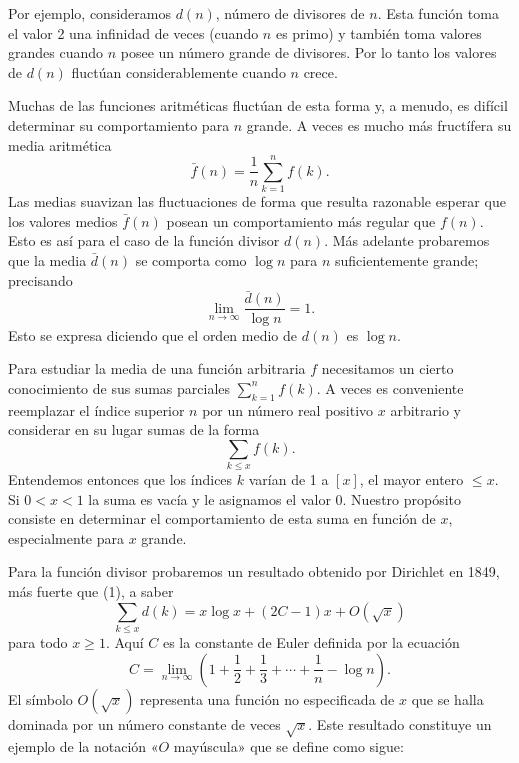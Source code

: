 \documentclass[12pt,a4paper]{book}
\begin{document}
    Por ejemplo, consideramos $d(n)$, número de divisores de $n$. Esta función toma el
    valor 2 una infinidad de veces (cuando $n$ es primo) y también toma valores grandes
    cuando $n$ posee un número grande de divisores. Por lo tanto los valores de $d(n)$
    fluctúan considerablemente cuando $n$ crece.

    Muchas de las funciones aritméticas fluctúan de esta forma y, a menudo, es difícil
    determinar su comportamiento para $n$ grande. A veces es mucho más fructífera su media
    aritmética
    \begin{equation*}
        \bar f(n)=\frac{1}{n}\sum_{k=1}^{n}f(k).
    \end{equation*}
    Las medias suavizan las fluctuaciones de forma que resulta razonable esperar que los
    valores medios $\bar f(n)$ posean un comportamiento más regular que $f(n)$. Esto es así
    para el caso de la función divisor $d(n)$. Más adelante probaremos que la media
    $\bar d(n)$ se comporta como $\log n$ para $n$ suficientemente grande; precisando
    \begin{equation}
        \lim_{n\to\infty}\frac{\bar d(n)}{\log n}=1.
    \end{equation}
    Esto se expresa diciendo que el orden medio de $d(n)$ es $\log n$.

    Para estudiar la media de una función arbitraria $f$ necesitamos un cierto conocimiento
    de sus sumas parciales $\sum_{k=1}^{n}f(k)$. A veces es conveniente reemplazar el
    índice superior $n$ por un número real positivo $x$ arbitrario y considerar en su
    lugar sumas de la forma
    \begin{equation*}
        \sum_{k\leq x}f(k).
    \end{equation*}
    Entendemos entonces que los índices $k$ varían de 1 a $[x]$, el mayor entero $\leq x$.
    Si $0<x<1$ la suma es vacía y le asignamos el valor 0. Nuestro propósito consiste en
    determinar el comportamiento de esta suma en función de $x$, especialmente para $x$
    grande.

    Para la función divisor probaremos un resultado obtenido por Dirichlet en 1849, más
    fuerte que (1), a saber
    \begin{equation}
        \sum_{k\leq x}d(k)=x\log x+(2C-1)x+O(\sqrt x)
    \end{equation}
    para todo $x\geq1$. Aquí $C$ es la constante de Euler definida por la ecuación
    \begin{equation}
        C=\lim_{n\to\infty}\left(1+\frac{1}{2}+\frac{1}{3}+\cdots+\frac{1}{n}-\log n\right).
    \end{equation}
    El símbolo $O(\sqrt x)$ representa una función no especificada de $x$ que se halla
    dominada por un número constante de veces $\sqrt x$. Este resultado constituye un
    ejemplo de la notación «$O$ mayúscula» que se define como sigue:
\end{document}
